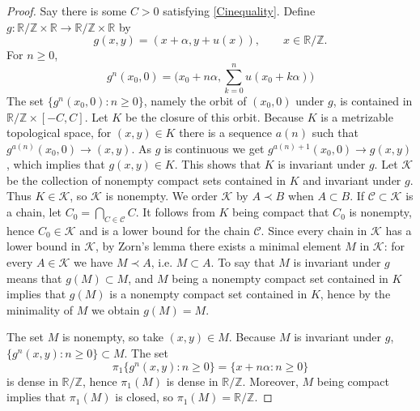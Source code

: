 \documentclass{article}
\theoremstyle{definition}
\begin{document}
\begin{proof}
Say there is some $C>0$ satisfying \eqref{Cinequality}. Define $g:\mathbb{R}/\mathbb{Z} \times \mathbb{R} \to \mathbb{R}/\mathbb{Z} \times \mathbb{R}$
by 
\[
g(x,y) = (x+\alpha,y+u(x)), \qquad x \in \mathbb{R} / \mathbb{Z}.
\]
For $n \geq 0$,
\[
g^n(x_0,0)=\Big(x_0+n\alpha,\sum_{k=0}^n u(x_0+k\alpha) \Big)
\]
The set $\{g^n(x_0,0): n \geq 0\}$, namely the orbit of $(x_0,0)$ under $g$, is contained in $\mathbb{R} / \mathbb{Z} \times [-C,C]$. 
Let $K$ be the closure of this orbit. 
Because $K$ is a metrizable topological space, for $(x,y) \in K$  there is a sequence $a(n)$ such that $g^{a(n)}(x_0,0) \to (x,y)$. As $g$ is continuous we get 
$g^{a(n)+1}(x_0,0) \to g(x,y)$, which implies that $g(x,y) \in K$. This shows that $K$ is invariant under $g$. Let $\mathscr{K}$ be the collection of nonempty compact
sets contained in $K$ and invariant under $g$. Thus $K \in \mathscr{K}$, so $\mathscr{K}$ is nonempty. We order $\mathscr{K}$ by $A \prec B$ when
$A \subset B$. If $\mathscr{C} \subset \mathscr{K}$ is a chain, let $C_0=\bigcap_{C \in \mathscr{C}} C$. It follows from $K$ being compact that $C_0$ is nonempty,
hence $C_0 \in \mathscr{K}$ and is a lower bound for the chain $\mathscr{C}$. Since every chain in $\mathscr{K}$ has a lower bound in $\mathscr{K}$,
by Zorn's lemma there exists a minimal element $M$ in $\mathscr{K}$: for every $A \in \mathscr{K}$ we have $M \prec A$, i.e. $M \subset A$. 
To say that $M$ is invariant under $g$ means that $g(M) \subset M$, and $M$ being a nonempty compact set contained in $K$ implies that
$g(M)$ is a nonempty compact set contained in $K$, hence by the minimality of $M$ we obtain $g(M)=M$.


The set $M$ is nonempty, so take $(x,y) \in M$. Because
$M$ is invariant under $g$,
$\{g^n(x,y): n \geq 0\} \subset M$.
The set
\[
\pi_1 \{g^n(x,y): n \geq 0\} = \{ x+n\alpha: n \geq 0\}
\]
 is dense in $\mathbb{R} / \mathbb{Z}$, hence $\pi_1(M)$ is dense in $\mathbb{R} / \mathbb{Z}$. Moreover,
  $M$ being compact implies that $\pi_1(M)$ is closed, so $\pi_1(M)=\mathbb{R}/\mathbb{Z}$. 
 

\end{proof}
\end{document}
